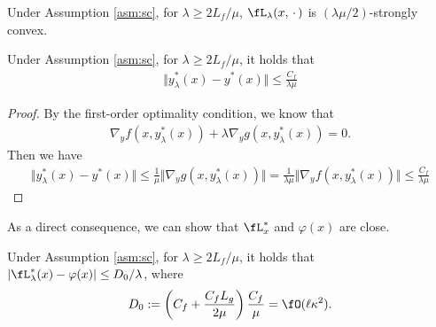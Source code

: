 \begin{lem} \label{lem:Lag-sc}
Under Assumption \ref{asm:sc}, for $\lambda \ge 2L_f /\mu$,   $\fL_{\lambda}(x,\,\cdot\,)$ is  $(\lambda \mu/2)$-strongly convex.  
\end{lem}



\begin{lem} \label{lem:yy-lambda}
    Under Assumption \ref{asm:sc}, for $\lambda \ge 2L_f/ \mu$, it holds that 
    \begin{align*}
        \Vert y_{\lambda}^*(x) - y^*(x) \Vert \le \frac{C_f}{\lambda \mu}
    \end{align*}
\end{lem}

\begin{proof}
By the first-order optimality condition, we know that
\begin{align*}
    \nabla_y f(x, y_{\lambda}^*(x)) + \lambda \nabla_y g(x,y_{\lambda}^*(x))  = 0.
\end{align*}
Then we have
\begin{align*}
    \Vert y_{\lambda}^*(x) - y^*(x) \Vert 
    \le \frac{1}{\mu} \Vert \nabla_y g(x,y_{\lambda}^*(x)) \Vert = \frac{1}{\lambda \mu} \Vert \nabla_y f(x,y_{\lambda}^*(x)) \Vert \le \frac{C_f}{\lambda \mu}
\end{align*}
\end{proof}

As a direct consequence, we can show that $\fL_{x}^*$ and $\varphi(x)$ are close.
\begin{lem} \label{lem:F-Lag-close}
 Under Assumption \ref{asm:sc}, for $\lambda \ge 2L_f / \mu$, it holds that $\vert \fL_{\lambda}^*(x) - \varphi(x) \vert \le D_0/ \lambda$, where
 \begin{align*}
     D_0 : = \left(C_f + \frac{C_f L_g}{2 \mu} \right) \frac{C_f }{\mu} = \fO(\ell \kappa^2).
 \end{align*}
\end{lem}


